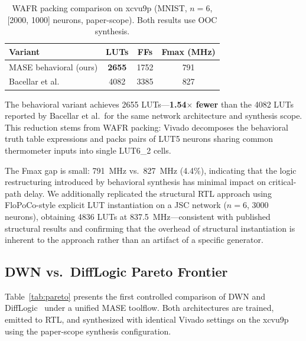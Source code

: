 \documentclass[conference]{IEEEtran}
\begin{document}
\begin{table}[t]
\centering
\caption{WAFR packing comparison on xcvu9p (MNIST, $n{=}6$, [2000, 1000] neurons, paper-scope). Both results use OOC synthesis.}
\label{tab:wafr}
\begin{tabular}{@{}lccc@{}}
\toprule
\textbf{Variant} & \textbf{LUTs} & \textbf{FFs} & \textbf{Fmax (MHz)} \\
\midrule
MASE behavioral (ours)           & \textbf{\num{2655}}  & \num{1752}  & \num{791}   \\
Bacellar et al.~\cite{bacellar2024dwn} & \num{4082}     & \num{3385}  & \num{827}   \\
\bottomrule
\end{tabular}
\end{table}

The behavioral variant achieves \num{2655} LUTs---\textbf{1.54$\times$ fewer} than the \num{4082} LUTs reported by Bacellar et al.\ for the same network architecture and synthesis scope.
This reduction stems from WAFR packing: Vivado decomposes the behavioral truth table expressions and packs pairs of LUT5 neurons sharing common thermometer inputs into single LUT6\_2 cells.

The Fmax gap is small: \SI{791}{\mega\hertz} vs.\ \SI{827}{\mega\hertz} (4.4\%), indicating that the logic restructuring introduced by behavioral synthesis has minimal impact on critical-path delay.
We additionally replicated the structural RTL approach using FloPoCo-style explicit LUT instantiation on a JSC network ($n{=}6$, \num{3000} neurons), obtaining \num{4836} LUTs at \SI{837.5}{\mega\hertz}---consistent with published structural results and confirming that the overhead of structural instantiation is inherent to the approach rather than an artifact of a specific generator.

\subsection{DWN vs.\ DiffLogic Pareto Frontier}
\label{sec:pareto}

Table~\ref{tab:pareto} presents the first controlled comparison of DWN and DiffLogic~\cite{petersen2022difflogic, jino2024difflogic} under a unified MASE toolflow.
Both architectures are trained, emitted to RTL, and synthesized with identical Vivado settings on the xcvu9p using the paper-scope synthesis configuration.
\end{document}
